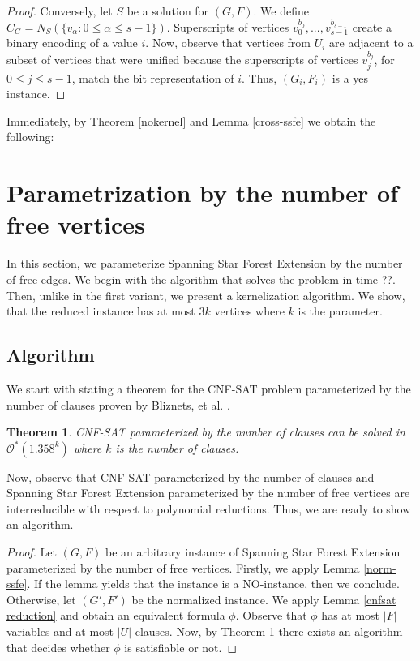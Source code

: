 \documentclass[en]{pracamgr}
\newtheorem{theorem}{Theorem}
\theoremstyle{definition}
\newcommand{\ssfep}{{\sc Spanning Star Forest Extension}}
\newcommand{\cnfsat}{{\sc CNF-SAT}}
\begin{document}
\begin{proof}
	Conversely, let $S$ be a solution for $(G,F)$. We define $C_G = N_S(\{v_\alpha: 0 \leq \alpha \leq s-1\})$. Superscripts of vertices $v^{b_0}_0,...,v^{b_{s-1}}_{s-1}$ create a binary encoding of a value $i$. Now, observe that vertices from $U_i$ are adjacent to a subset of vertices that were unified because the superscripts of vertices $v^{b_j}_j$, for $0 \leq j \leq s-1$, match the bit representation of $i$. Thus, $(G_i,F_i)$ is a yes instance.
	
\end{proof}

Immediately, by Theorem \ref{nokernel} and Lemma \ref{cross-ssfe} we obtain the following:

\thmssfepnokernel*

\section{Parametrization by the number of free vertices}

In this section, we parameterize  \ssfep{} by the number of free edges. We begin with the algorithm that solves the problem in time ??.%
Then, unlike in the first variant, we present a kernelization algorithm. We show, that the reduced instance has at most $3k$ vertices where $k$ is the parameter.

\subsection{Algorithm}
We start with stating a theorem for the \cnfsat{} problem parameterized by the number of clauses proven by Bliznets, et al. \cite{MAXSAT}.

\begin{theorem}\label{cnfsatmtime}
	\cnfsat{} parameterized by the number of clauses can be solved in $\mathcal{O}^*(1.358^k)$ where $k$ is the number of clauses.
\end{theorem}

Now, observe that \cnfsat{} parameterized by the number of clauses and \ssfep{} parameterized by the number of free vertices are interreducible with respect to polynomial reductions. Thus, we are ready to show an algorithm.

\thmssfepfetime*

\begin{proof}
	Let $(G,F)$ be an arbitrary instance of \ssfep{} parameterized by the number of free vertices. Firstly, we apply Lemma \ref{norm-ssfe}. If the lemma yields that the instance is a NO-instance, then we conclude. Otherwise, let $(G',F')$ be the normalized instance. We apply Lemma \ref{cnfsat reduction} and obtain an equivalent formula $\phi$. Observe that $\phi$ has at most $|F|$ variables and at most $|U|$ clauses. Now, by Theorem \ref{cnfsatmtime} there exists an algorithm that decides whether $\phi$ is satisfiable or not.
\end{proof}
\end{document}
